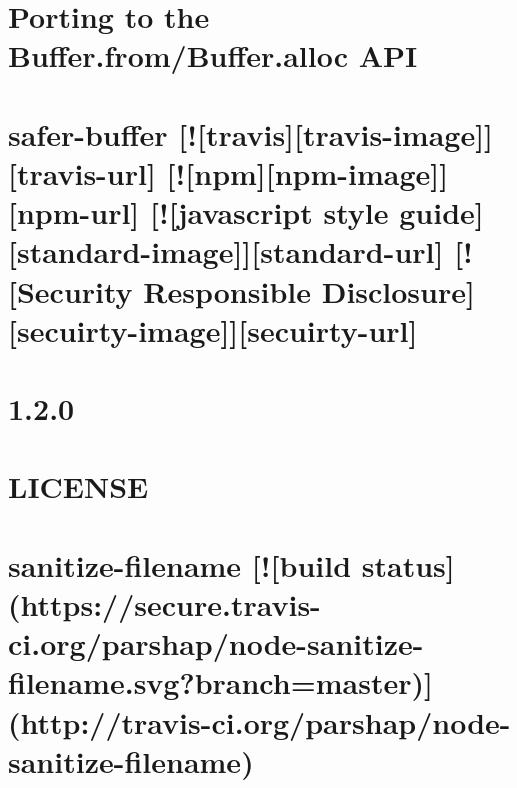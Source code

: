 \documentclass[twoside]{book}
\newcommand{\+}{\discretionary{\mbox{\scriptsize$\hookleftarrow$}}{}{}}
\begin{document}
\chapter{Porting to the Buffer.\+from/\+Buffer.alloc A\+PI}
\label{md_dsmacc_examples_DRmerge_node_modules_safer-buffer_Porting-Buffer}

\chapter{safer-\/buffer \mbox{[}!\mbox{[}travis\mbox{]}\mbox{[}travis-\/image\mbox{]}\mbox{]}\mbox{[}travis-\/url\mbox{]} \mbox{[}!\mbox{[}npm\mbox{]}\mbox{[}npm-\/image\mbox{]}\mbox{]}\mbox{[}npm-\/url\mbox{]} \mbox{[}!\mbox{[}javascript style guide\mbox{]}\mbox{[}standard-\/image\mbox{]}\mbox{]}\mbox{[}standard-\/url\mbox{]} \mbox{[}!\mbox{[}Security Responsible Disclosure\mbox{]}\mbox{[}secuirty-\/image\mbox{]}\mbox{]}\mbox{[}secuirty-\/url\mbox{]}}
\label{md_dsmacc_examples_DRmerge_node_modules_safer-buffer_Readme}

\chapter{1.2.0}
\label{md_dsmacc_examples_DRmerge_node_modules_sanitize-filename_Changelog}

\chapter{L\+I\+C\+E\+N\+SE}
\label{md_dsmacc_examples_DRmerge_node_modules_sanitize-filename_LICENSE}

\chapter{sanitize-\/filename \mbox{[}!\mbox{[}build status\mbox{]}(https\+://secure.travis-\/ci.org/parshap/node-\/sanitize-\/filename.svg?branch=master)\mbox{]}(http\+://travis-\/ci.org/parshap/node-\/sanitize-\/filename)}
\label{md_dsmacc_examples_DRmerge_node_modules_sanitize-filename_README}

\end{document}
